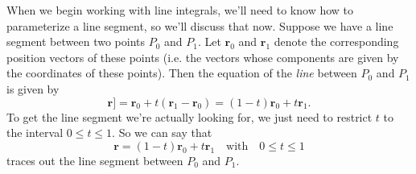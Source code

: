 \documentclass[10pt,]{book}
\numberwithin{equation}{section}
\newcommand{\vv}[1]{\mathbf{#1}}
\begin{document}
\hypertarget{p-1212}{}%
When we begin working with line integrals, we'll need to know how to parameterize a line segment, so we'll discuss that now. Suppose we have a line segment between two points \(P_{0}\) and \(P_{1}\). Let \(\vv{r}_{0}\) and \(\vv{r}_{1}\) denote the corresponding position vectors of these points (i.e. the vectors whose components are given by the coordinates of these points). Then the equation of the \emph{line} between \(P_{0}\) and \(P_{1}\) is given by%
%
\begin{equation*}
\vv{r}] = \vv{r}_{0}+t(\vv{r}_{1}-\vv{r}_{0}) = (1-t)\vv{r}_{0}+t\vv{r}_{1}.
\end{equation*}
\hypertarget{p-1213}{}%
To get the line segment we're actually looking for, we just need to restrict \(t\) to the interval \(0\leq t\leq 1\). So we can say that%
%
\begin{equation*}
\vv{r} = (1-t)\vv{r}_{0}+t\vv{r}_{1} \quad\text{with}\quad0\leq t\leq 1
\end{equation*}
\hypertarget{p-1214}{}%
traces out the line segment between \(P_{0}\) and \(P_{1}\).%
%
%
\typeout{************************************************}
\typeout{************************************************}
%
\end{document}
